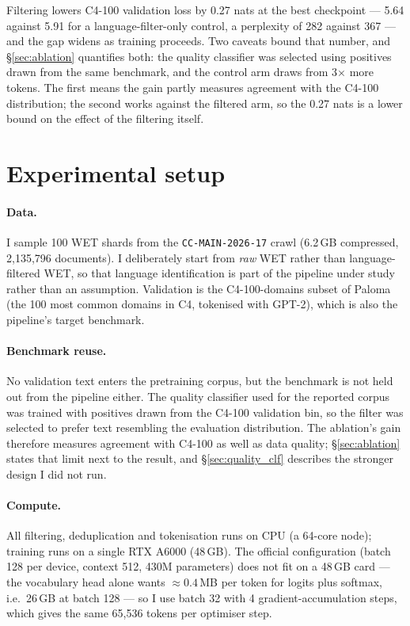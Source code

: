 \documentclass{article}
\begin{document}
Filtering lowers C4-100 validation loss by 0.27 nats at the best checkpoint --- 5.64 against
5.91 for a language-filter-only control, a perplexity of 282 against 367 --- and the gap
widens as training proceeds. Two caveats bound that number, and §\ref{sec:ablation} quantifies
both: the quality classifier was selected using positives drawn from the same benchmark, and
the control arm draws from 3$\times$ more tokens. The first means the gain partly measures
agreement with the C4-100 distribution; the second works against the filtered arm, so the
0.27 nats is a lower bound on the effect of the filtering itself.

\section{Experimental setup}
\label{sec:setup}

\paragraph{Data.}
I sample 100 WET shards from the \texttt{CC-MAIN-2026-17} crawl (6.2\,GB compressed,
2{,}135{,}796 documents). I deliberately start from \emph{raw} WET rather than
language-filtered WET, so that language identification is part of the pipeline under study
rather than an assumption. Validation is the C4-100-domains subset of
Paloma~\cite{paloma} (the 100 most common domains in C4, tokenised with GPT-2), which is also
the pipeline's target benchmark.

\paragraph{Benchmark reuse.}
No validation text enters the pretraining corpus, but the benchmark is not held out from the
pipeline either. The quality classifier used for the reported corpus was trained with positives
drawn from the C4-100 validation bin, so the filter was selected to prefer text resembling the
evaluation distribution. The ablation's gain therefore measures agreement with C4-100 as well
as data quality; §\ref{sec:ablation} states that limit next to the result, and
§\ref{sec:quality_clf} describes the stronger design I did not run.

\paragraph{Compute.}
All filtering, deduplication and tokenisation runs on CPU (a 64-core node); training runs on a
single RTX A6000 (48\,GB). The official configuration (batch 128 per device, context 512,
430M parameters) does not fit on a 48\,GB card --- the vocabulary head alone wants
$\approx 0.4$\,MB per token for logits plus softmax, i.e.\ 26\,GB at batch 128 --- so I use
batch 32 with 4 gradient-accumulation steps, which gives the same 65{,}536 tokens per
optimiser step.
\end{document}
